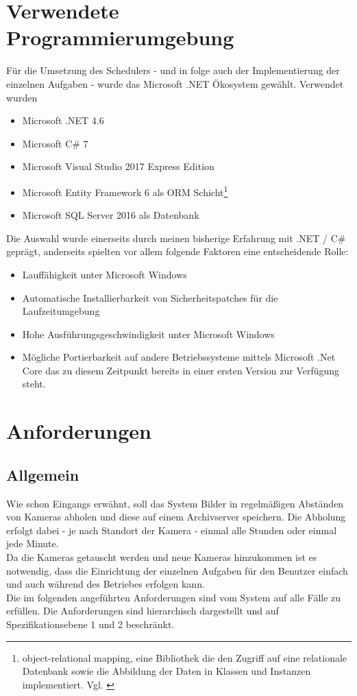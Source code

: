 \section{Verwendete Programmierumgebung}
Für die Umsetzung des Schedulers - und in folge auch der Implementierung der einzelnen Aufgaben - wurde das Microsoft .NET Ökosystem gewählt. Verwendet wurden
\begin{itemize}
	\item Microsoft .NET 4.6
	\item Microsoft C\# 7
	\item Microsoft Visual Studio 2017 Express Edition
	\item Microsoft Entity Framework 6 als ORM Schicht\footnote{object-relational mapping, eine Bibliothek die den Zugriff auf eine relationale Datenbank sowie die Abbildung der Daten in Klassen und Instanzen implementiert. Vgl. \parencite{ef_orm} }
	\item Microsoft SQL Server 2016 als Datenbank
\end{itemize}
Die Auswahl wurde einerseits durch meinen bisherige Erfahrung mit .NET / C\# geprägt, anderseits spielten vor allem folgende Faktoren eine entscheidende Rolle:
\begin{itemize}
	\item Lauffähigkeit unter Microsoft Windows
	\item Automatische Installierbarkeit von Sicherheitspatches für die Laufzeitumgebung
	\item Hohe Ausführungsgeschwindigkeit unter Microsoft Windows
	\item Mögliche Portierbarkeit auf andere Betriebssysteme mittels Microsoft .Net Core das zu diesem Zeitpunkt bereits in einer ersten Version zur Verfügung steht.
\end{itemize}
\section{Anforderungen}\label{chap:Anforderungen}
\subsection{Allgemein}
Wie schon Eingangs erwähnt, soll das System Bilder in regelmäßigen Abständen von Kameras abholen und diese auf einem Archivserver speichern. Die Abholung erfolgt dabei - je nach Standort der Kamera - einmal alle Stunden oder einmal jede Minute.\\
Da die Kameras getauscht werden und neue Kameras hinzukommen ist es notwendig, dass die Einrichtung der einzelnen Aufgaben für den Benutzer einfach und auch während des Betriebes erfolgen kann.\\
Die im folgenden angeführten Anforderungen sind vom System auf alle Fälle zu erfüllen. Die Anforderungen sind hierarchisch dargestellt und auf Spezifikationsebene 1 und 2 beschränkt\parencite[S. 45]{rupp2009}.
